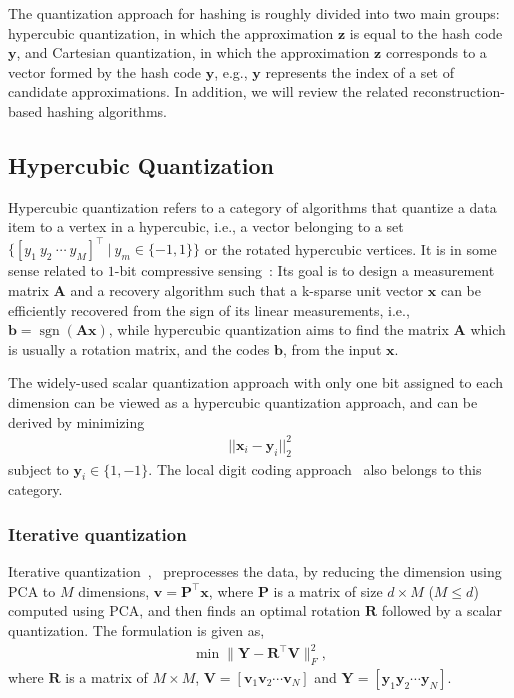 \documentclass[10pt,journal,compsoc]{IEEEtran}
\begin{document}
The quantization approach for hashing
is roughly divided into two main groups:
hypercubic quantization,
in which the approximation $\mathbf{z}$ is equal to the hash code $\mathbf{y}$,
and
Cartesian quantization,
in which
the approximation $\mathbf{z}$ corresponds to a vector formed
by the hash code $\mathbf{y}$,
e.g., $\mathbf{y}$ represents the index of a set of candidate approximations.
In addition,
we will review the related reconstruction-based hashing algorithms.


\subsection{Hypercubic Quantization}
\label{sec:LTH2:HD}
Hypercubic quantization refers to
a category of algorithms
that quantize a data item
to a vertex in a hypercubic,
i.e., a vector belonging to
a set $\{[y_1~y_2~\cdots~ y_M]^\top~|~y_m \in \{-1, 1\}\}$
or the rotated hypercubic vertices.
It is in some sense related to $1$-bit compressive sensing~\cite{BoufounosB08}:
Its goal is to design a measurement matrix $\mathbf{A}$
and a recovery algorithm
such that a k-sparse unit vector $\mathbf{x}$
can be efficiently recovered from the sign of its linear measurements,
i.e., $\mathbf{b} = \operatorname{sgn}(\mathbf{A}\mathbf{x})$,
while
hypercubic quantization
aims to find the matrix $\mathbf{A}$ which is usually a rotation matrix,
and the codes $\mathbf{b}$, from the input $\mathbf{x}$.

The widely-used scalar quantization approach
with only one bit assigned to each dimension
can be viewed as a hypercubic quantization approach,
and can be derived
by minimizing
\begin{align}
||\mathbf{x}_i - \mathbf{y}_i||^2_2
\label{eqn:scalarquantizationloss}
\end{align}
subject to $\mathbf{y}_i \in \{1,-1\}$.
The local digit coding approach~\cite{KoudasOST04}
also belongs to this category.


\subsubsection{Iterative quantization}
Iterative quantization~\cite{GongL11},~\cite{GongLGP13}
preprocesses the data,
by reducing the dimension using PCA to $M$ dimensions,
$\mathbf{v} = \mathbf{P}^\top\mathbf{x}$,
where $\mathbf{P}$ is a matrix of size $d\times M$ ($M \leqslant d$)
computed using PCA,
and then finds an optimal rotation $\mathbf{R}$ followed by a scalar quantization.
The formulation is given as,
\begin{align}
\min\|\mathbf{Y} - \mathbf{R}^\top\mathbf{V}\|_F^2, \label{eqn:ObjectiveFunctionForITQ}
\end{align}
where $\mathbf{R}$ is a matrix of $M \times M$,
$\mathbf{V} = [\mathbf{v}_1 \mathbf{v}_2\cdots\mathbf{v}_N]$
and $\mathbf{Y} = [\mathbf{y}_1 \mathbf{y}_2\cdots \mathbf{y}_N]$.
\end{document}
